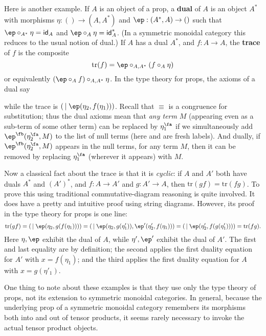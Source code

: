 \documentclass{book}
\def\tr{\mathrm{tr}}
\def\idfunc{\mathsf{id}}
\let\types\vdash
\begin{document}
Here is another example.
If $A$ is an object of a prop, a \textbf{dual} of $A$ is an object $A^*$ with morphisms $\eta:()\to (A,A^*)$ and $\ep:(A^*,A)\to ()$ such that $\ep \circ_{A^*} \eta = \idfunc_A$ and $\ep \circ_{A} \eta = \idfunc_A^*$.
(In a symmetric monoidal category this reduces to the usual notion of dual.)
If $A$ has a dual $A^*$, and $f:A\to A$, the \textbf{trace} of $f$ is the composite
\[ \tr(f) = \ep \circ_{A,A^*} (f \circ_A \eta) \]
or equivalently $(\ep \circ_A f)\circ_{A,A^*} \eta$.
In the type theory for props, the axioms of a dual say
while the trace is $(\,\mid \ep(\eta_2,f(\eta_1)))$.
Recall that $\equiv$ is a congruence for substitution; thus the dual axioms mean that \emph{any term} $M$ (appearing even as a sub-term of some other term) can be replaced by $\eta_1^\fa$ if we simultaneously add $\ep^\fb(\eta_2^\fa,M)$ to the list of null terms (here \fa and \fb are fresh labels).
And dually, if $\ep^\fb(\eta_2^\fa,M)$ appears in the null terms, for any term $M$, then it can be removed by replacing $\eta_1^\fa$ (wherever it appears) with $M$.

Now a classical fact about the trace is that it is \emph{cyclic}: if $A$ and $A'$ both have duals $A^*$ and $(A')^*$, and $f:A\to A'$ and $g:A'\to A$, then $\tr(gf) = \tr(fg)$.
To prove this using traditional commutative-diagram reasoning is quite involved.
It does have a pretty and intuitive proof using string diagrams.
However, its proof in the type theory for props is one line:
\[ \tr(gf) = (\,\mid \ep(\eta_2,g(f(\eta_1))))
= (\,\mid \ep(\eta_2,g(\eta'_1)),\ep'(\eta'_2,f(\eta_1)))
= (\,\mid \ep(\eta'_2,f(g(\eta'_1))))
= \tr(fg).
\]
Here $\eta,\ep$ exhibit the dual of $A$, while $\eta',\ep'$ exhibit the dual of $A'$.
The first and last equality are by definition;
the second applies the first duality equation for $A'$ with $x=f(\eta_1)$; and the third applies the first duality equation for $A$ with $x=g(\eta'_1)$.

One thing to note about these examples is that they use only the type theory of props, not its extension to symmetric monoidal categories.
In general, because the underlying prop of a symmetric monoidal category remembers its morphisms both into and out of tensor products, it seems rarely necessary to invoke the actual tensor product objects.
\end{document}
